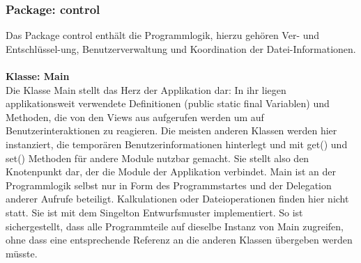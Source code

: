 \documentclass[13pt,a4paper,bibliography=totocnumbered,listof=totocnumbered]{scrartcl}
\begin{document}
\subsubsection{Package: control}
Das Package control enthält die Programmlogik, hierzu gehören Ver- und Entschlüssel-ung, Benutzerverwaltung und Koordination der Datei-Informationen.\\\\
\textbf{Klasse: Main}\\
Die Klasse Main stellt das Herz der Applikation dar: In ihr liegen applikationsweit verwendete Definitionen (public static final Variablen) und Methoden, die von den Views aus aufgerufen werden um auf Benutzerinteraktionen zu reagieren. Die meisten anderen Klassen werden hier instanziert, die temporären Benutzerinformationen hinterlegt und mit get() und set() Methoden für andere Module nutzbar gemacht. Sie stellt also den Knotenpunkt dar, der die Module der Applikation verbindet. Main ist an der Programmlogik selbst nur in Form des Programmstartes und der Delegation anderer Aufrufe beteiligt. Kalkulationen oder Dateioperationen finden hier nicht statt. Sie ist mit dem Singelton Entwurfsmuster implementiert. So ist sichergestellt, dass alle Programmteile auf dieselbe Instanz von Main zugreifen, ohne dass eine entsprechende Referenz an die anderen Klassen übergeben werden müsste.\\
\pagebreak
\end{document}
